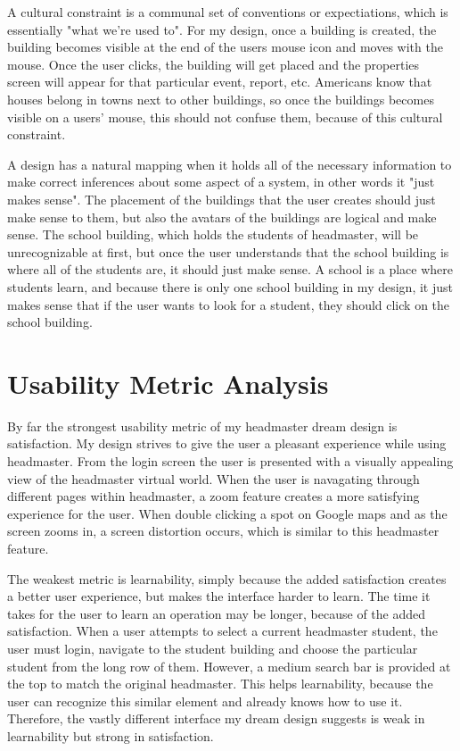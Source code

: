 \documentclass[11pt]{article}
\begin{document}
A cultural constraint is a communal set of conventions or expectiations, which is essentially "what we're used to". For my design, once a building is created, the building becomes visible at the end of the users mouse icon and moves with the mouse. Once the user clicks, the building will get placed and the properties screen will appear for that particular event, report, etc. Americans know that houses belong in towns next to other buildings, so once the buildings becomes visible on a users' mouse, this should not confuse them, because of this cultural constraint. 

A design has a natural mapping when it holds all of the necessary information to make correct inferences about some aspect of a system, in other words it "just makes sense". The placement of the buildings that the user creates should just make sense to them, but also the avatars of the buildings are logical and make sense. The school building, which holds the students of headmaster, will be unrecognizable at first, but once the user understands that the school building is where all of the students are, it should just make sense. A school is a place where students learn, and because there is only one school building in my design, it just makes sense that if the user wants to look for a student, they should click on the school building. 


\section{Usability Metric Analysis}
By far the strongest usability metric of my headmaster dream design is satisfaction. My design strives to give the user a pleasant experience while using headmaster. From the login screen the user is presented with a visually appealing view of the headmaster virtual world. When the user is navagating through different pages within headmaster, a zoom feature creates a more satisfying experience for the user. When double clicking a spot on Google maps and as the screen zooms in, a screen distortion occurs, which is similar to this headmaster feature.

The weakest metric is learnability, simply because the added satisfaction creates a better user experience, but makes the interface harder to learn. The time it takes for the user to learn an operation may be longer, because of the added satisfaction. When a user attempts to select a current headmaster student, the user must login, navigate to the student building and choose the particular student from the long row of them. However, a medium search bar is provided at the top to match the original headmaster. This helps learnability, because the user can recognize this similar element and already knows how to use it. Therefore, the vastly different interface my dream design suggests is weak in learnability but strong in satisfaction.
\end{document}
